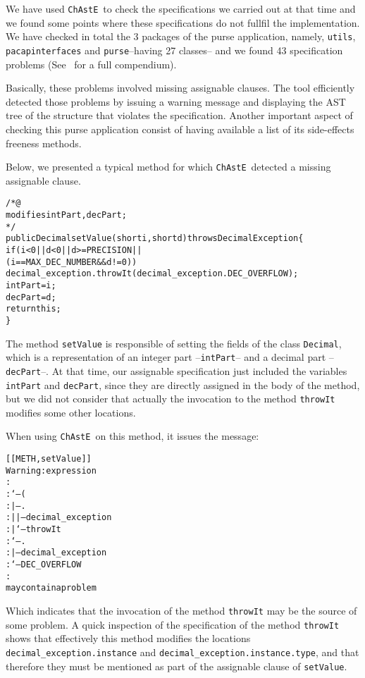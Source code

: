 \documentclass[a4paper]{llncs}
\newcommand{\modtool}{\texttt{ChAstE}}
\begin{document}
We have used \modtool~to check the specifications we carried out at
that time and we found some points where these specifications do not
fullfil the implementation. We have checked in total
the 3 packages of the purse application, namely, \texttt{utils},
\texttt{pacapinterfaces} and \texttt{purse}--having 27 classes--
and we found 43 specification problems (See~\cite{CatanoH02URL} for a
full compendium).

Basically, these problems involved missing assignable clauses. The tool
efficiently detected those problems by issuing a warning message 
and displaying the \textsc{AST} tree of the structure that violates
the specification. Another important aspect of checking this purse
application consist of having available a list of its side-effects
freeness methods.


Below, we presented a typical method for which \modtool~detected a
missing assignable clause. 
\begin{alltt}
/*@ 
  modifies intPart, decPart;
*/ 
public Decimal setValue(short i, short d) throws DecimalException\verb!{!
  if(i < 0 || d < 0 || d >= PRECISION || 
     (i == MAX_DEC_NUMBER && d != 0))
    decimal_exception.throwIt(decimal_exception.DEC_OVERFLOW);
  intPart = i;
  decPart = d;
  return this;
\verb!}!
\end{alltt}
The method \texttt{setValue} is responsible of setting the fields of
the class \texttt{Decimal}, which is a representation of an integer
part --\texttt{intPart}-- and a decimal part --\texttt{decPart}--. At
that time, our assignable specification just included the 
variables \texttt{intPart} and \texttt{decPart}, since they are directly
assigned in the body of the method, but we did not consider that
actually the invocation to the method \texttt{throwIt} modifies some
other locations.

When using \modtool~on this method, it issues the message$:$
\begin{alltt}
[[METH,setValue]]
Warning: expression
:
:`--(
:   |--. 
:   |  |--decimal_exception
:   |  `--throwIt
:   `--.
:      |--decimal_exception
:      `--DEC_OVERFLOW
:
may contain a problem
\end{alltt}

Which indicates that the invocation of the method \texttt{throwIt}
may be the source of some problem. A quick inspection of the
specification of the method \texttt{throwIt} shows that effectively
this method
modifies the locations \texttt{decimal\_exception.instance} and
\texttt{decimal\_exception.instance.type}, and that therefore they
must be mentioned as part of the assignable clause of
\texttt{setValue}.
\end{document}
